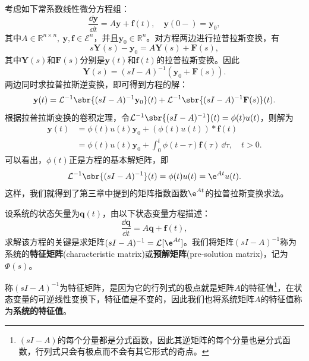 考虑如下常系数线性微分方程组：
\begin{equation}
    \frac{\dd\mathbf{y}}{\dd t}=A\mathbf{y}+\mathbf{f}(t),\quad \mathbf{y}(0-)=\mathbf{y}_0,
\end{equation}
其中$A\in\mathbb{R}^{n\times n},\ \mathbf{y},\mathbf{f}\in\mathcal{E}^n$，并且$\mathbf{y}_0\in\mathbb{R}^n$。对方程两边进行拉普拉斯变换，有
\begin{equation}
    s\mathbf{Y}(s)-\mathbf{y}_0=A\mathbf{Y}(s)+\mathbf{F}(s),
\end{equation}
其中$\mathbf{Y}(s)$和$\mathbf{F}(s)$分别是$\mathbf{y}(t)$和$\mathbf{f}(t)$的拉普拉斯变换。因此
\begin{equation}
    \mathbf{Y}(s)=(sI-A)^{-1}(\mathbf{y}_0+\mathbf{F}(s)).
\end{equation}
两边同时求拉普拉斯逆变换，即可得到方程的解：
\begin{equation}
    \mathbf{y}(t)=\mathcal{L}^{-1}\sbr{(sI-A)^{-1}\mathbf{y}_0}(t)+\mathcal{L}^{-1}\sbr{(sI-A)^{-1}\mathbf{F}(s)}(t).
\end{equation}
根据拉普拉斯变换的卷积定理，令$\mathcal{L}^{-1}\sbr{(sI-A)^{-1}}(t)=\phi(t)u(t)$，则解为
\begin{align}
    \mathbf{y}(t)&=\phi(t)u(t)\mathbf{y}_0+(\phi(t)u(t))*\mathbf{f}(t)\nonumber\\
    &=\phi(t)u(t)\mathbf{y}_0+\int_0^{t}\phi(t-\tau)\mathbf{f}(\tau)\,\dd\tau,\quad t>0.
\end{align}
可以看出，$\phi(t)$正是方程的基本解矩阵，即
\begin{equation}
    \mathcal{L}^{-1}\sbr{(sI-A)^{-1}}(t)=\phi(t)u(t)=\e^{At}u(t).
\end{equation}
这样，我们就得到了第三章中提到的矩阵指数函数$\e^{At}$的拉普拉斯变换求法。

\begin{definition}
    设系统的状态矢量为$\mathbf{q}(t)$，由以下状态变量方程描述：
    \begin{equation}
        \frac{\dd\mathbf{q}}{\dd t}=A\mathbf{q}+\mathbf{f}(t),
    \end{equation}
    求解该方程的关键是求矩阵$(sI-A)^{-1}=\mathcal{L}[\e^{At}]$。我们将矩阵$(sI-A)^{-1}$称为系统的\textbf{特征矩阵}(characteristic matrix)或\textbf{预解矩阵}(pre-solution matrix)，记为$\Phi(s)$。
\end{definition}

称$(sI-A)^{-1}$为特征矩阵，是因为它的行列式的极点就是矩阵$A$的特征值\footnote{$(sI-A)$的每个分量都是分式函数，因此其逆矩阵的每个分量也是分式函数，行列式只会有极点而不会有其它形式的奇点。}，在状态变量的可逆线性变换下，特征值是不变的，因此我们也将系统矩阵$A$的特征值称为\textbf{系统的特征值}。


